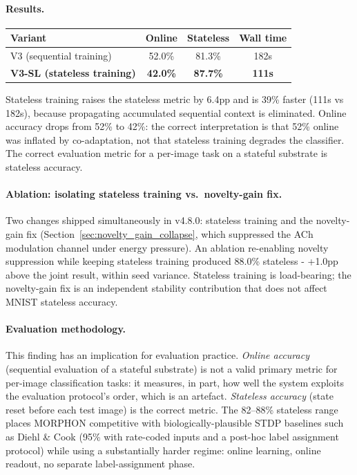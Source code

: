 \paragraph{Results.}
\begin{center}
\begin{tabular}{lccc}
\hline
Variant & Online & Stateless & Wall time \\
\hline
V3 (sequential training)  & 52.0\% & 81.3\% & 182s \\
\textbf{V3-SL (stateless training)} & \textbf{42.0\%} & \textbf{87.7\%} & \textbf{111s} \\
\hline
\end{tabular}
\end{center}

Stateless training raises the stateless metric by 6.4pp and is 39\% faster (111s vs 182s), because propagating accumulated sequential context is eliminated. Online accuracy drops from 52\% to 42\%: the correct interpretation is that 52\% online was inflated by co-adaptation, not that stateless training degrades the classifier. The correct evaluation metric for a per-image task on a stateful substrate is stateless accuracy.

\paragraph{Ablation: isolating stateless training vs.\ novelty-gain fix.}
Two changes shipped simultaneously in v4.8.0: stateless training and the novelty-gain fix (Section~\ref{sec:novelty_gain_collapse}, which suppressed the ACh modulation channel under energy pressure). An ablation re-enabling novelty suppression while keeping stateless training produced 88.0\% stateless - +1.0pp above the joint result, within seed variance. Stateless training is load-bearing; the novelty-gain fix is an independent stability contribution that does not affect MNIST stateless accuracy.

\paragraph{Evaluation methodology.}
This finding has an implication for evaluation practice. \emph{Online accuracy} (sequential evaluation of a stateful substrate) is not a valid primary metric for per-image classification tasks: it measures, in part, how well the system exploits the evaluation protocol's order, which is an artefact. \emph{Stateless accuracy} (state reset before each test image) is the correct metric. The 82--88\% stateless range places MORPHON competitive with biologically-plausible STDP baselines such as Diehl \& Cook \citeyearpar{diehl2015unsupervised} (95\% with rate-coded inputs and a post-hoc label assignment protocol) while using a substantially harder regime: online learning, online readout, no separate label-assignment phase.

